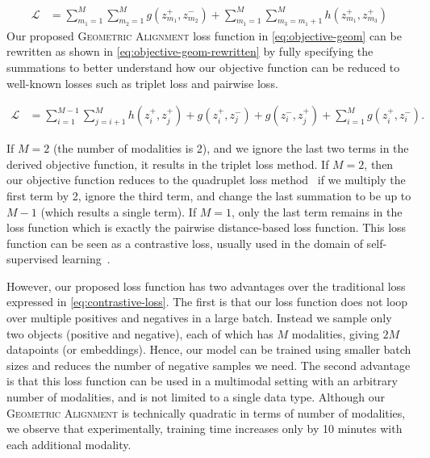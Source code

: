 \documentclass[sigconf,natbib=true,anonymous=true]{acmart}
\newcommand{\geom}{\textsc{Geometric Alignment}}
\begin{document}
\begin{equation}\label{eq:objective-geom}
\begin{split}
    \mathcal{L} & = \sum_{m_1=1}^{M}  \sum_{m_2=1}^{M} g(z_{m_1}^{+}, z_{m_2}^{-})  + \sum_{m_1=1}^{M} \sum_{m_3=m_1+1}^{M} h(z_{m_1}^{+},z_{m_3}^{+})
\end{split}    
\end{equation}
Our proposed \geom{} loss function in \cref{eq:objective-geom} can be rewritten as shown in \cref{eq:objective-geom-rewritten} by fully specifying the summations to better understand how our objective function can be reduced to well-known losses such as triplet loss and pairwise loss.

\begin{equation}\label{eq:objective-geom-rewritten}
\begin{split}
     \mathcal{L} &= \sum_{i=1}^{M-1} \sum_{j=i+1}^{M} h( z_{i}^{+} , z_{j}^{+})
     + g( z_{i}^{+} , z_{j}^{-}) + g( z_{i}^{-} , z_{j}^{+}) + \sum_{i=1}^{M} g( z_{i}^{+} , z_{i}^{-} ).
\end{split}
\end{equation}

If $M=2$ (the number of modalities is 2), and we ignore the last two terms in the derived objective function, it results in the triplet loss method. 
If $M=2$, then our objective function reduces to the quadruplet loss method~\citep{tursun2021efficient,chen2017beyond} if we multiply the first term by 2, ignore the third term, and change the last summation to be up to $M-1$ (which results a single term). 
If $M=1$, only the last term remains in the loss function which is exactly the pairwise distance-based loss function.
This loss function can be seen as a contrastive loss, usually used in the domain of self-supervised learning~\citep{chen2020simple}. 

However, our proposed loss function has two advantages over the traditional loss expressed in \cref{eq:contrastive-loss}. The first is that our loss function does not loop over multiple positives and negatives in a large batch. Instead we sample only two objects (positive and negative), each of which has $M$ modalities, giving $2M$ datapoints (or embeddings). Hence, our model can be trained using smaller batch sizes and reduces the number of negative samples we need. The second advantage is that this loss function can be used in a multimodal setting with an arbitrary number of modalities, and is not limited to a single data type.
Although our \geom{} is technically quadratic in terms of number of modalities, we observe that experimentally, training time increases only by 10 minutes with each additional modality.
\end{document}
